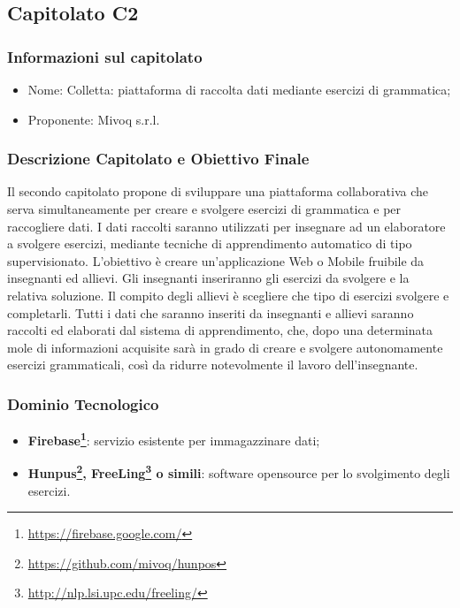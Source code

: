\subsection{Capitolato C2}

\subsubsection{Informazioni sul capitolato}

\begin{itemize}
	\item Nome: Colletta: piattaforma di raccolta dati mediante esercizi di grammatica;
	\item Proponente: Mivoq s.r.l.
\end{itemize}

\subsubsection{Descrizione Capitolato e Obiettivo Finale}
Il secondo capitolato propone di sviluppare una piattaforma collaborativa che serva simultaneamente per 
creare e svolgere esercizi di grammatica e per raccogliere dati.
I dati raccolti saranno utilizzati per insegnare ad un elaboratore a svolgere esercizi, mediante tecniche di apprendimento automatico di tipo supervisionato.
L'obiettivo è creare un'applicazione Web o Mobile fruibile da insegnanti ed allievi. Gli insegnanti inseriranno gli esercizi da svolgere e la relativa soluzione. Il compito degli allievi è scegliere che tipo di esercizi svolgere e completarli. Tutti i dati che saranno inseriti da insegnanti e allievi saranno raccolti ed elaborati dal sistema di apprendimento, che, dopo una determinata mole di informazioni acquisite sarà in grado di creare e svolgere autonomamente esercizi grammaticali, così da ridurre notevolmente il lavoro dell'insegnante.

\subsubsection{Dominio Tecnologico}
\begin{itemize}
	\item \textbf{Firebase\footnote{\hyperref[Link al sito]{https://firebase.google.com/}}}: servizio esistente per immagazzinare dati;
	\item \textbf{Hunpus\footnote{\hyperref[Link al sito]{https://github.com/mivoq/hunpos}}, FreeLing\footnote{\hyperref[Link al sito]{http://nlp.lsi.upc.edu/freeling/}} o simili}: software opensource per lo svolgimento degli esercizi. 
\end{itemize}

